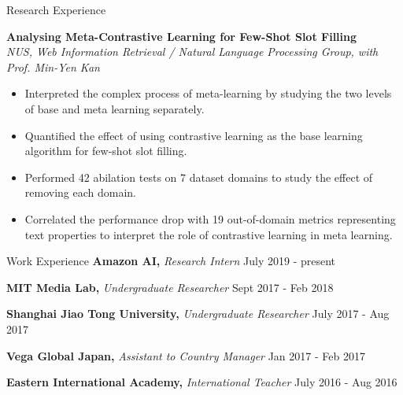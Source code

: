 \documentclass{resume} %
\begin{document}
\begin{rSection}{Research Experience}

{\bf Analysing Meta-Contrastive Learning for Few-Shot Slot Filling} \hfill { } 
\\ \textit{NUS, Web Information Retrieval / Natural Language Processing Group, with Prof. Min-Yen Kan} \hfill { \em }
\begin{itemize}
\item Interpreted the complex process of meta-learning by studying the two levels of base and meta learning separately.
\item Quantified the effect of using contrastive learning as the base learning algorithm for few-shot slot filling.
\item Performed 42 abilation tests on 7 dataset domains to study the effect of removing each domain.
\item Correlated the performance drop with 19 out-of-domain metrics representing text properties to interpret the role of contrastive learning in meta learning.
\end{itemize}


\end{rSection}




\begin{rSection}{Work Experience}
{\bf Amazon AI,} \textit{Research Intern} \hfill {July 2019 - present}

{\bf MIT Media Lab,} \textit{Undergraduate Researcher} \hfill {Sept 2017 - Feb 2018}

{\bf Shanghai Jiao Tong University,} \textit{Undergraduate Researcher} \hfill {July 2017 - Aug 2017}

{\bf Vega Global Japan,} \textit{Assistant to Country Manager} \hfill {Jan 2017 - Feb 2017}

  

{\bf Eastern International Academy,} \textit{International Teacher} \hfill {July 2016 - Aug 2016}
\end{rSection}
\end{document}
